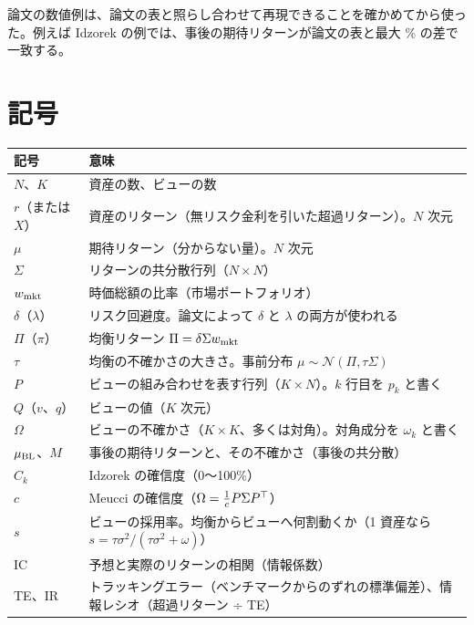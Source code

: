 論文の数値例は、論文の表と照らし合わせて再現できることを確かめてから使った。例えば Idzorek の例では、事後の期待リターンが論文の表と最大 \% の差で一致する。

\section*{記号}

\begin{center}
\small
\begin{tabular}{p{2.2cm}p{11.4cm}}
\toprule
記号 & 意味 \\
\midrule
$N$、$K$ & 資産の数、ビューの数 \\
$r$（または $X$） & 資産のリターン（無リスク金利を引いた超過リターン）。$N$ 次元 \\
$\mu$ & 期待リターン（分からない量）。$N$ 次元 \\
$\Sigma$ & リターンの共分散行列（$N\times N$） \\
$w_{\mathrm{mkt}}$ & 時価総額の比率（市場ポートフォリオ） \\
$\delta$（$\lambda$） & リスク回避度。論文によって $\delta$ と $\lambda$ の両方が使われる \\
$\Pi$（$\pi$） & 均衡リターン $\Pi=\delta\Sigma w_{\mathrm{mkt}}$ \\
$\tau$ & 均衡の不確かさの大きさ。事前分布 $\mu\sim\mathcal N(\Pi,\tau\Sigma)$ \\
$P$ & ビューの組み合わせを表す行列（$K\times N$）。$k$ 行目を $p_k$ と書く \\
$Q$（$v$、$q$） & ビューの値（$K$ 次元） \\
$\Omega$ & ビューの不確かさ（$K\times K$、多くは対角）。対角成分を $\omega_k$ と書く \\
$\mu_{\mathrm{BL}}$、$M$ & 事後の期待リターンと、その不確かさ（事後の共分散） \\
$C_k$ & Idzorek の確信度（0〜100\%） \\
$c$ & Meucci の確信度（$\Omega=\frac{1}{c}P\Sigma P^{\top}$） \\
$s$ & ビューの採用率。均衡からビューへ何割動くか（1 資産なら $s=\tau\sigma^2/(\tau\sigma^2+\omega)$） \\
IC & 予想と実際のリターンの相関（情報係数） \\
TE、IR & トラッキングエラー（ベンチマークからのずれの標準偏差）、情報レシオ（超過リターン ÷ TE） \\
\bottomrule
\end{tabular}
\end{center}

